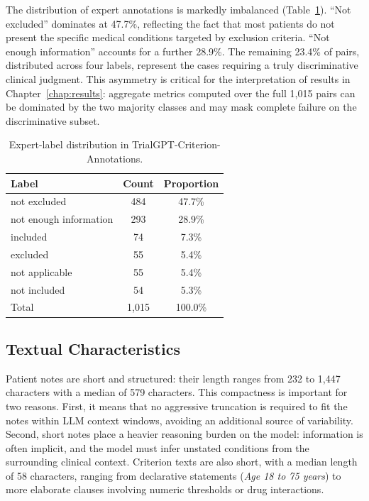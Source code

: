 The distribution of expert annotations is markedly imbalanced 
(Table~\ref{tab:met-label-freq}). ``Not excluded'' dominates at 47.7\%, 
reflecting the fact that most patients do not present the specific medical 
conditions targeted by exclusion criteria. ``Not enough information'' 
accounts for a further 28.9\%. The remaining 23.4\% of pairs, distributed 
across four labels, represent the cases requiring a truly discriminative 
clinical judgment. This asymmetry is critical for the interpretation of 
results in Chapter~\ref{chap:results}: aggregate metrics computed over the 
full 1{,}015 pairs can be dominated by the two majority classes and may 
mask complete failure on the discriminative subset.

\begin{table}[htbp]
    \centering
    \caption{Expert-label distribution in TrialGPT-Criterion-Annotations.}
    \label{tab:met-label-freq}
    \begin{tabular}{@{}lcc@{}}
        \toprule
        \textbf{Label} & \textbf{Count} & \textbf{Proportion} \\
        \midrule
        not excluded & 484 & 47.7\% \\
        not enough information & 293 & 28.9\% \\
        included & 74 & 7.3\% \\
        excluded & 55 & 5.4\% \\
        not applicable & 55 & 5.4\% \\
        not included & 54 & 5.3\% \\
        \midrule
        Total & 1{,}015 & 100.0\% \\
        \bottomrule
    \end{tabular}
\end{table}

\subsection{Textual Characteristics}
\label{subsec:met-data-text}

Patient notes are short and structured: their length ranges from 232 to 
1{,}447 characters with a median of 579 characters. This compactness is 
important for two reasons. First, it means that no aggressive truncation is 
required to fit the notes within LLM context windows, avoiding an additional 
source of variability. Second, short notes place a heavier reasoning burden 
on the model: information is often implicit, and the model must infer 
unstated conditions from the surrounding clinical context. Criterion texts 
are also short, with a median length of 58 characters, ranging from 
declarative statements (\emph{Age 18 to 75 years}) to more elaborate clauses 
involving numeric thresholds or drug interactions.

